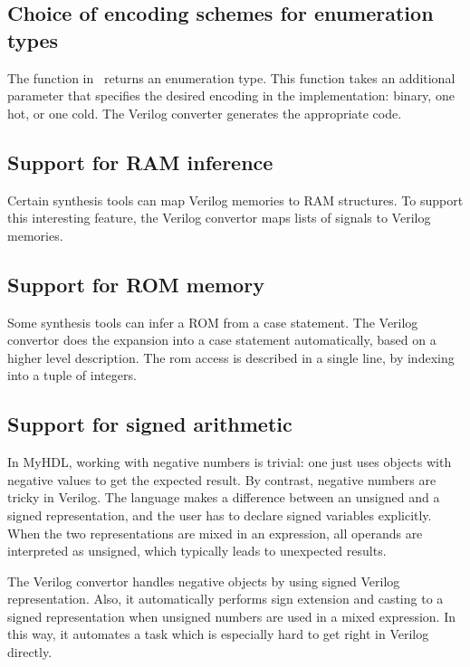 \subsection{Choice of encoding schemes for enumeration types\label{conv-features-enum}}
The  function in \myhdl\ returns an enumeration type. This
function takes an additional parameter  that specifies the
desired encoding in the implementation: binary, one hot, or one cold.
The Verilog converter generates the appropriate code.

\subsection{Support for RAM inference \label{conf-features-ram}}
Certain synthesis tools can map Verilog memories to RAM
structures. To support this interesting feature, the Verilog convertor
maps lists of signals to Verilog memories.

\subsection{Support for ROM memory \label{conf-features-rom}}
Some synthesis tools can infer a ROM
from a case statement. The Verilog convertor does the expansion into
a case statement automatically, based on a higher level
description. The rom access is described in a single line, by
indexing into a tuple of integers.

\subsection{Support for signed arithmetic \label{conf-features-signed}}
In MyHDL, working with negative numbers is trivial: one just uses
 objects with negative values to get the expected result.
By contrast, negative numbers are tricky in Verilog. The language
makes a difference between an unsigned and a signed representation,
and the user has to declare signed variables explicitly.  When the two
representations are mixed in an expression, all operands are
interpreted as unsigned, which typically leads to unexpected results.

The Verilog convertor handles negative  objects by using
signed Verilog representation. Also, it automatically performs sign
extension and casting to a signed representation when unsigned numbers
are used in a mixed expression. In this way, it automates a task which
is especially hard to get right in Verilog directly.

